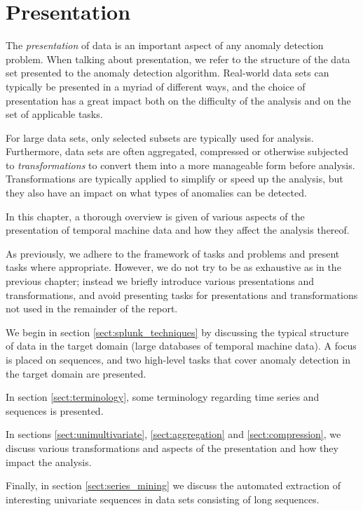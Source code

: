 \chapter{Presentation}
\label{ch:transformations}

The \emph{presentation} of data is an important aspect of any anomaly detection problem. When talking about presentation, we refer to the structure of the data set presented to the anomaly detection algorithm. Real-world data sets can typically be presented in a myriad of different ways, and the choice of presentation has a great impact both on the difficulty of the analysis and on the set of applicable tasks.

For large data sets, only selected subsets are typically used for analysis. Furthermore, data sets are often aggregated, compressed or otherwise subjected to \emph{transformations} to convert them into a more manageable form before analysis. Transformations are typically applied to simplify or speed up the analysis, but they also have an impact on what types of anomalies can be detected.

In this chapter, a thorough overview is given of various aspects of the presentation of temporal machine data and how they affect the analysis thereof.

As previously, we adhere to the framework of tasks and problems and present tasks where appropriate. However, we do not try to be as exhaustive as in the previous chapter; instead we briefly introduce various presentations and transformations, and avoid presenting tasks for presentations and transformations not used in the remainder of the report.

We begin in section \ref{sect:splunk_techniques} by discussing the typical structure of data in the target domain (large databases of temporal machine data). A focus is placed on sequences, and two high-level tasks that cover anomaly detection in the target domain are presented.

In section \ref{sect:terminology}, some terminology regarding time series and sequences is presented.

In sections \ref{sect:unimultivariate}, \ref{sect:aggregation} and \ref{sect:compression}, we discuss various transformations and aspects of the presentation and how they impact the analysis.

Finally, in section \ref{sect:series_mining} we discuss the automated extraction of interesting univariate sequences in data sets consisting of long sequences. 

